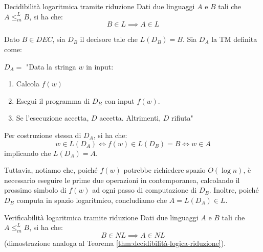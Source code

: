 \begin{Thm}{Decidibilità logaritmica tramite riduzione}{}\label{thm:decidibilità-logica-riduzione}
Dati due linguaggi $A$ e $B$ tali che $A\leq^L_m B$, si ha che:
\begin{equation*}
    B\in L\implies A\in L    
\end{equation*}
\begin{demonstration}
Dato $B\in DEC$, sia $D_B$ il decisore tale che $L(D_B) = B$. Sia $D_A$ la TM definita come:

$D_A =$ "Data la stringa $w$ in input:
\begin{enumerate}
    \item Calcola $f(w)$
    \item Esegui il programma di $D_B$ con input $f(w)$.
    \item Se l’esecuzione accetta, $D$ accetta. Altrimenti, $D$ rifiuta"
\end{enumerate}
Per costruzione stessa di $D_A$, si ha che:
\begin{equation*}
    w\in L(D_A)\iff f(w)\in L(D_B) = B\iff w\in A    
\end{equation*}
implicando che $L(D_A) = A$.

Tuttavia, notiamo che, poiché $f(w)$ potrebbe richiedere spazio $O(\log n)$, è necessario eseguire le prime due operazioni in contemporanea, calcolando il prossimo simbolo di $f(w)$ ad ogni passo di computazione di $D_B$. Inoltre, poiché $D_B$ computa in spazio logaritmico, concludiamo che $A = L(D_A)\in L$.
\end{demonstration}
\end{Thm}

\begin{Thm}{Verificabilità logaritmica tramite riduzione}{}
Dati due linguaggi $A$ e $B$ tali che $A\leq^L_m B$, si ha che:
\begin{equation*}
    B\in NL\implies A\in NL    
\end{equation*}
(dimostrazione analoga al Teorema \ref{thm:decidibilità-logica-riduzione}).
\end{Thm}

